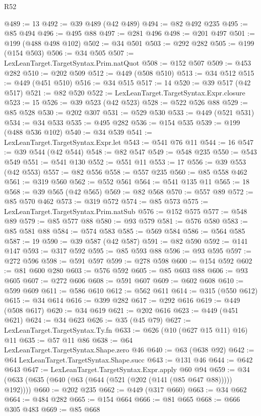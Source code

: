 \begin{lexlean}{R52}
\begin{coremodule}
@489 := 13
@492 := @39 @489 (@42 @489)
@494 := @82 @492 @235
@495 := @85 @494
@496 := @495 @88
@497 := @281 @496
@498 := @201 @497
@501 := @199 (@488 @498 @102)
@502 := @34 @501
@503 := @292 @282
@505 := @199 (@154 @503)
@506 := @34 @505
@507 := LexLeanTarget.TargetSyntax.Prim.natQuot
@508 := @152 @507
@509 := @453 @282
@510 := @202 @509
@512 := @449 (@508 @510)
@513 := @34 @512
@515 := @449 (@451 @510)
@516 := @34 @515
@517 := 14
@520 := @39 @517 (@42 @517)
@521 := @82 @520
@522 := LexLeanTarget.TargetSyntax.Expr.closure
@523 := 15
@526 := @39 @523 (@42 @523)
@528 := @522 @526 @88
@529 := @85 @528
@530 := @202 @307
@531 := @529 @530
@533 := @449 (@521 @531)
@534 := @34 @533
@535 := @495 @282
@536 := @154 @535
@539 := @199 (@488 @536 @102)
@540 := @34 @539
@541 := LexLeanTarget.TargetSyntax.Expr.let
@543 := @541 @76 @11
@544 := 16
@547 := @39 @544 (@42 @544)
@548 := @82 @547
@549 := @548 @235
@550 := @543 @549
@551 := @541 @130
@552 := @551 @11
@553 := 17
@556 := @39 @553 (@42 @553)
@557 := @82 @556
@558 := @557 @235
@560 := @85 @558 @462
@561 := @319 @560
@562 := @552 @561
@564 := @541 @135 @11
@565 := 18
@568 := @39 @565 (@42 @565)
@569 := @82 @568
@570 := @557 @89
@572 := @85 @570 @462
@573 := @319 @572
@574 := @85 @573
@575 := LexLeanTarget.TargetSyntax.Prim.natSub
@576 := @152 @575
@577 := @548 @89
@579 := @85 @577 @88
@580 := @93 @579
@581 := @576 @580
@583 := @85 @581 @88
@584 := @574 @583
@585 := @569 @584
@586 := @564 @585
@587 := 19
@590 := @39 @587 (@42 @587)
@591 := @82 @590
@592 := @141 @147
@593 := @317 @592
@595 := @85 @593 @88
@596 := @93 @595
@597 := @272 @596
@598 := @591 @597
@599 := @278 @598
@600 := @154 @592
@602 := @81 @600 @280
@603 := @576 @592
@605 := @85 @603 @88
@606 := @93 @605
@607 := @272 @606
@608 := @591 @607
@609 := @602 @608
@610 := @599 @609
@611 := @586 @610
@612 := @562 @611
@614 := @315 (@550 @612)
@615 := @34 @614
@616 := @399 @282
@617 := @292 @616
@619 := @449 (@508 @617)
@620 := @34 @619
@621 := @202 @616
@623 := @449 (@451 @621)
@624 := @34 @623
@626 := @35 (@45 @79)
@627 := LexLeanTarget.TargetSyntax.Ty.fn
@633 := @626 (@10 (@627 @15 @11) @16) @11
@635 := @57 @11 @86
@638 := @64 LexLeanTarget.TargetSyntax.Shape.zero @46
@640 := @63 (@638 @92)
@642 := @64 LexLeanTarget.TargetSyntax.Shape.succ
@643 := @131 @46
@644 := @642 @643
@647 := LexLeanTarget.TargetSyntax.Expr.apply @60 @94
@659 := @34 (@633 (@635 (@640 (@63 (@644 (@521 (@202 (@141 (@85 @647 @88))))) @192))))
@660 := @202 @235
@662 := @449 (@317 @660)
@663 := @34 @662
@664 := @484 @282
@665 := @154 @664
@666 := @81 @665
@668 := @666 @305 @483
@669 := @85 @668

\end{coremodule}
\end{lexlean}
